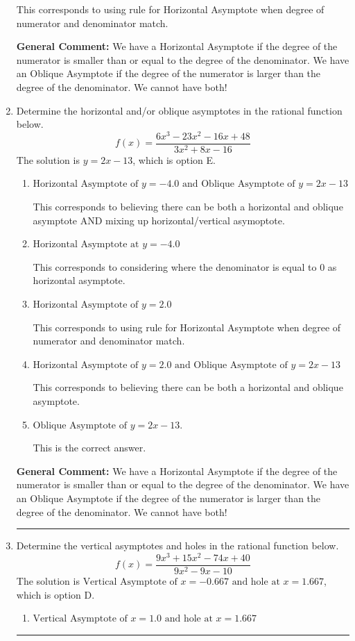 \documentclass{extbook}[14pt]
\newcommand{\litem}[1]{\item #1

\rule{\textwidth}{0.4pt}}
\begin{document}
\begin{enumerate}
{\begin{enumerate}[label=\Alph*.]
This corresponds to using rule for Horizontal Asymptote when degree of numerator and denominator match.
\end{enumerate}

\textbf{General Comment:} We have a Horizontal Asymptote if the degree of the numerator is smaller than or equal to the degree of the denominator. We have an Oblique Asymptote if the degree of the numerator is larger than the degree of the denominator. We cannot have both!
}
\litem{
Determine the horizontal and/or oblique asymptotes in the rational function below.
\[ f(x) = \frac{6x^{3} -23 x^{2} -16 x + 48}{3x^{2} +8 x -16} \]The solution is \( y = 2x -13 \), which is option E.\begin{enumerate}[label=\Alph*.]
\item \( \text{Horizontal Asymptote of } y = -4.0 \text{ and Oblique Asymptote of } y = 2x -13 \)

This corresponds to believing there can be both a horizontal and oblique asymptote AND mixing up horizontal/vertical asymoptote.
\item \( \text{Horizontal Asymptote at } y = -4.0 \)

This corresponds to considering where the denominator is equal to 0 as horizontal asymptote.
\item \( \text{Horizontal Asymptote of } y = 2.0  \)

This corresponds to using rule for Horizontal Asymptote when degree of numerator and denominator match.
\item \( \text{Horizontal Asymptote of } y = 2.0 \text{ and Oblique Asymptote of } y = 2x -13 \)

This corresponds to believing there can be both a horizontal and oblique asymptote.
\item \( \text{Oblique Asymptote of } y = 2x -13. \)

This is the correct answer.
\end{enumerate}

\textbf{General Comment:} We have a Horizontal Asymptote if the degree of the numerator is smaller than or equal to the degree of the denominator. We have an Oblique Asymptote if the degree of the numerator is larger than the degree of the denominator. We cannot have both!
}
\litem{
Determine the vertical asymptotes and holes in the rational function below.
\[ f(x) = \frac{9x^{3} +15 x^{2} -74 x + 40}{9x^{2} -9 x -10} \]The solution is \( \text{Vertical Asymptote of } x = -0.667 \text{ and hole at } x = 1.667 \), which is option D.\begin{enumerate}[label=\Alph*.]
\item \( \text{Vertical Asymptote of } x = 1.0 \text{ and hole at } x = 1.667 \)


\end{enumerate}}
\end{enumerate}
\end{document}
